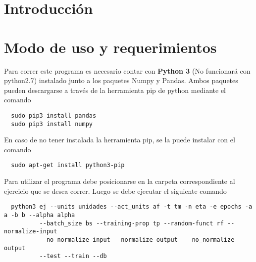\section{Introducción}


\section{Modo de uso y requerimientos}
Para correr este programa es necesario contar con \textbf{Python 3} (No funcionará con python2.7) instalado junto a los paquetes Numpy y Pandas. Ambos paquetes pueden descargarse a través
de la herramienta pip de python mediante el comando
\begin{verbatim}
  sudo pip3 install pandas
  sudo pip3 install numpy
\end{verbatim}
En caso de no tener instalada la herramienta pip, se la puede instalar con el comando
\begin{verbatim}
  sudo apt-get install python3-pip
\end{verbatim}

Para utilizar el programa debe posicionarse en la carpeta correspondiente al ejercicio que se desea correr. Luego se debe ejecutar el siguiente comando
\begin{verbatim}
  python3 ej --units unidades --act_units af -t tm -n eta -e epochs -a a -b b --alpha alpha
          --batch_size bs --training-prop tp --random-funct rf --normalize-input
          --no-normalize-input --normalize-output  --no_normalize-output
          --test --train --db
\end{verbatim}

